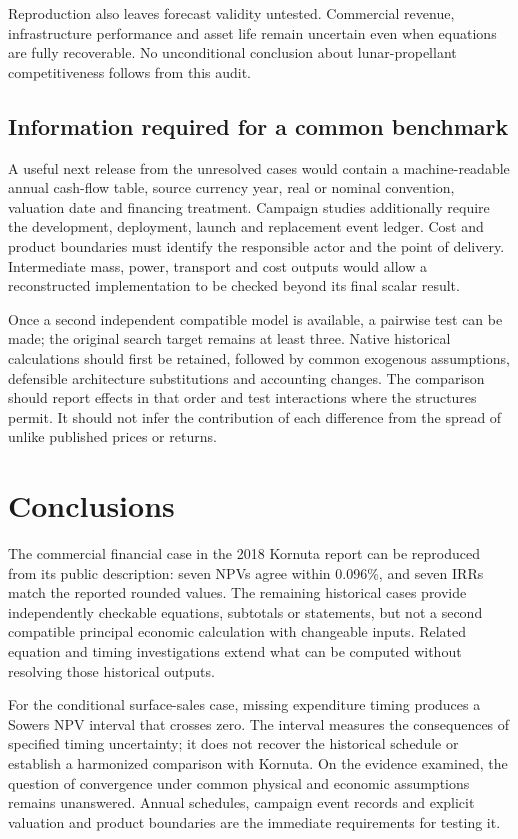 \documentclass[final,5p,times,twocolumn]{elsarticle}
\begin{document}
Reproduction also leaves forecast validity untested. Commercial revenue, infrastructure performance and asset life remain uncertain even when equations are fully recoverable. No unconditional conclusion about lunar-propellant competitiveness follows from this audit.

\subsection{Information required for a common benchmark}
A useful next release from the unresolved cases would contain a machine-readable annual cash-flow table, source currency year, real or nominal convention, valuation date and financing treatment. Campaign studies additionally require the development, deployment, launch and replacement event ledger. Cost and product boundaries must identify the responsible actor and the point of delivery. Intermediate mass, power, transport and cost outputs would allow a reconstructed implementation to be checked beyond its final scalar result.

Once a second independent compatible model is available, a pairwise test can be made; the original search target remains at least three. Native historical calculations should first be retained, followed by common exogenous assumptions, defensible architecture substitutions and accounting changes. The comparison should report effects in that order and test interactions where the structures permit. It should not infer the contribution of each difference from the spread of unlike published prices or returns.

\section{Conclusions}
The commercial financial case in the 2018 Kornuta report can be reproduced from its public description: seven NPVs agree within 0.096\%, and seven IRRs match the reported rounded values. The remaining historical cases provide independently checkable equations, subtotals or statements, but not a second compatible principal economic calculation with changeable inputs. Related equation and timing investigations extend what can be computed without resolving those historical outputs.

For the conditional surface-sales case, missing expenditure timing produces a Sowers NPV interval that crosses zero. The interval measures the consequences of specified timing uncertainty; it does not recover the historical schedule or establish a harmonized comparison with Kornuta. On the evidence examined, the question of convergence under common physical and economic assumptions remains unanswered. Annual schedules, campaign event records and explicit valuation and product boundaries are the immediate requirements for testing it.
\end{document}
